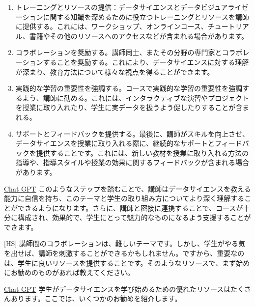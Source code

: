 \documentclass[
]{bxjsbook}
\theoremstyle{definition}
\theoremstyle{definition}
\theoremstyle{definition}
\theoremstyle{definition}
\theoremstyle{remark}
\begin{document}
\begin{enumerate}
\def\labelenumi{\arabic{enumi}.}
\item
  トレーニングとリソースの提供：データサイエンスとデータビジュアライゼーションに関する知識を深めるために役立つトレーニングとリソースを講師に提供する。これには、ワークショップ、オンラインコース、チュートリアル、書籍やその他のリソースへのアクセスなどが含まれる場合があります。
\item
  コラボレーションを奨励する。講師同士、またその分野の専門家とコラボレーションすることを奨励する。これにより、データサイエンスに対する理解が深まり、教育方法について様々な視点を得ることができます。
\item
  実践的な学習の重要性を強調する。コースで実践的な学習の重要性を強調するよう、講師に勧める。これには、インタラクティブな演習やプロジェクトを授業に取り入れたり、学生に実データを扱うよう促したりすることが含まれる。
\item
  サポートとフィードバックを提供する。最後に、講師がスキルを向上させ、データサイエンスを授業に取り入れる際に、継続的なサポートとフィードバックを提供することです。これには、新しい教材を授業に取り入れる方法の指導や、指導スタイルや授業の効果に関するフィードバックが含まれる場合があります。
\end{enumerate}

\protect\hyperlink{chatgpt}{Chat GPT} このようなステップを踏むことで、講師はデータサイエンスを教える能力に自信を持ち、このテーマと学生の取り組み方についてより深く理解することができるようになります。さらに、講師と密接に連携することで、コースが十分に構成され、効果的で、学生にとって魅力的なものになるよう支援することができます。

{[}HS{]} 講師間のコラボレーションは、難しいテーマです。しかし、学生がやる気を出せば、講師を刺激することができるかもしれません。ですから、重要なのは、学生に良いリソースを提供することです。そのようなリソースで、まず始めにお勧めのものがあれば教えてください。

\protect\hyperlink{chatgpt}{Chat GPT} 学生がデータサイエンスを学び始めるための優れたリソースはたくさんあります。ここでは、いくつかのお勧めを紹介します。
\end{document}
